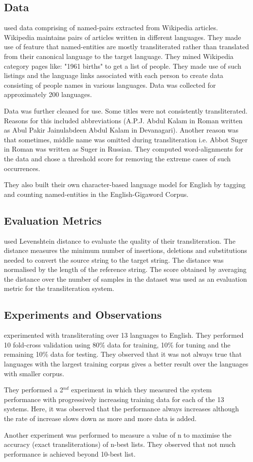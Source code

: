 \documentclass[11pt,a4paper]{article}
\begin{document}
\subsection{Data}
\citet{burch-1} used data comprising of named-pairs extracted from Wikipedia articles. Wikipedia maintains pairs of articles written in different languages. They made use of feature that named-entities are mostly transliterated rather than translated from their canonical language to the target language. They mined Wikipedia category pages like: "1961 births" to get a list of people. They made use of such listings and the language links associated with each person to create data consisting of people names in various languages. Data was collected for approximately 200 languages.
\par
Data was further cleaned for use. Some titles were not consistently transliterated. Reasons for this included abbreviations (A.P.J. Abdul Kalam in Roman written as Abul Pakir Jainulabdeen Abdul Kalam in Devanagari). Another reason was that sometimes, middle name was omitted during transliteration i.e. Abbot Suger in Roman was written as Suger in Russian. They computed word-alignments for the data and chose a threshold score for removing the extreme cases of such occurrences.
\par
They also built their own character-based language model for English by tagging and counting named-entities in the English-Gigaword Corpus.

\subsection{Evaluation Metrics}
\citet{burch-1} used Levenshtein distance to evaluate the quality of their transliteration. The distance measures the minimum number of insertions, deletions and substitutions needed to convert the source string to the target string. The distance was normalised by the length of the reference string. The score obtained by averaging the distance over the number of samples in the dataset was used as an evaluation metric for the transliteration system.

\subsection{Experiments and Observations}
\citet{burch-1} experimented with transliterating over 13 languages to English. They performed 10 fold-cross validation using 80\% data for training, 10\% for tuning and the remaining 10\% data for testing. They observed that it was not always true that languages with the largest training corpus gives a better result over the languages with smaller corpus. 
\par
They performed a 2$^{nd}$ experiment in which they measured the system performance with progressively increasing training data for each of the 13 systems. Here, it was observed that the performance always increases although the rate of increase slows down as more and more data is added. 
\par
Another experiment was performed to measure a value of n to maximise the accuracy (exact transliterations) of n-best lists. They observed that not much performance is achieved beyond 10-best list.
\end{document}
